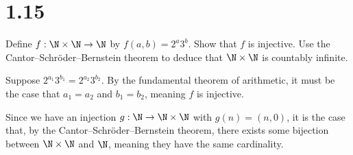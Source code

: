 \documentclass[10pt]{mypackage}
\begin{document}
\RaggedRight
\section{1.15}%
\begin{problem}
  Define $f: \N\times\N\rightarrow\N$ by $f(a,b) = 2^a3^b$. Show that $f$ is injective. Use the Cantor--Schröder--Bernstein theorem to deduce that $\N\times\N$ is countably infinite.
\end{problem}
\begin{solution}
  Suppose $2^{a_1}3^{b_1} = 2^{a_2}3^{b_2}$. By the fundamental theorem of arithmetic, it must be the case that $a_1 = a_2$ and $b_1 = b_2$, meaning $f$ is injective.\newline

  Since we have an injection $g: \N\rightarrow \N\times\N$ with $g(n) = (n,0)$, it is the case that, by the Cantor--Schröder--Bernstein theorem, there exists some bijection between $\N\times\N$ and $\N$, meaning they have the same cardinality.
\end{solution}
\end{document}
